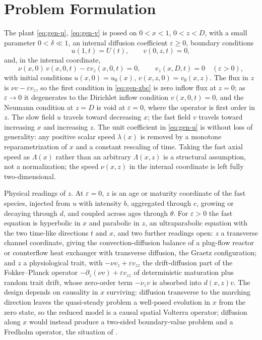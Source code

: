 \documentclass[12pt]{article}
\theoremstyle{plain}
\theoremstyle{remark}
\begin{document}
\section{Problem Formulation}
The plant \eqref{eq:gen-u}, \eqref{eq:gen-v} is posed on $0<x<1$, $0<z<D$, with a small parameter $0<\delta\ll1$, an internal diffusion coefficient $\varepsilon\ge0$, boundary conditions
\begin{equation}
 u(1,t)=U(t),\qquad v(0,z,t)=0,
 \label{eq:gen-bc}
\end{equation}
and, in the internal coordinate,
\begin{equation}
 \nu(x,0)\,v(x,0,t)-\varepsilon v_z(x,0,t)=0,
 \qquad
 v_z(x,D,t)=0\quad(\varepsilon>0),
 \label{eq:gen-zbc}
\end{equation}
with initial conditions $u(x,0)=u_0(x)$, $v(x,z,0)=v_0(x,z)$. The flux in $z$ is $\nu v-\varepsilon v_z$, so the first condition in \eqref{eq:gen-zbc} is zero inflow flux at $z=0$; as $\varepsilon\to0$ it degenerates to the Dirichlet inflow condition $v(x,0,t)=0$, and the Neumann condition at $z=D$ is void at $\varepsilon=0$, where the operator is first order in $z$. The slow field $u$ travels toward decreasing $x$; the fast field $v$ travels toward increasing $x$ and increasing $z$. The unit coefficient in \eqref{eq:gen-u} is without loss of generality: any positive scalar speed $\lambda(x)$ is removed by a monotone reparametrization of $x$ and a constant rescaling of time. Taking the fast axial speed as $\Lambda(x)$ rather than an arbitrary $\Lambda(x,z)$ is a structural assumption, not a normalization; the speed $\nu(x,z)$ in the internal coordinate is left fully two-dimensional.

Physical readings of $z$. At $\varepsilon=0$, $z$ is an age or maturity coordinate of the fast species, injected from $u$ with intensity $b$, aggregated through $c$, growing or decaying through $d$, and coupled across ages through $\theta$. For $\varepsilon>0$ the fast equation is hyperbolic in $x$ and parabolic in $z$, an ultraparabolic equation with the two time-like directions $t$ and $x$, and two further readings open: $z$ a transverse channel coordinate, giving the convection-diffusion balance of a plug-flow reactor or counterflow heat exchanger with transverse diffusion, the Graetz configuration; and $z$ a physiological trait, with $-\nu v_z+\varepsilon v_{zz}$ the drift-diffusion part of the Fokker--Planck operator $-\partial_z(\nu v)+\varepsilon v_{zz}$ of deterministic maturation plus random trait drift, whose zero-order term $-\nu_zv$ is absorbed into $d(x,z)v$. The design depends on causality in $x$ surviving: diffusion transverse to the marching direction leaves the quasi-steady problem a well-posed evolution in $x$ from the zero state, so the reduced model is a causal spatial Volterra operator; diffusion along $x$ would instead produce a two-sided boundary-value problem and a Fredholm operator, the situation of \cite{AlalabiMorris2024,AlalabiMorris2025}.
\end{document}
